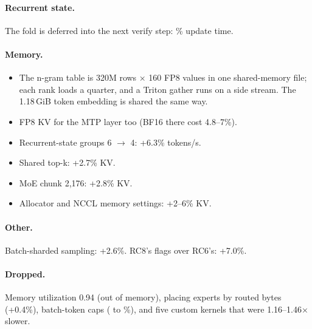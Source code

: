 \documentclass[10pt]{article}
\newcommand{\appminus}{\textminus}
\newcommand{\appminus}{\symbol{"2212}}
\newcommand{\mn}{\appminus}                     %
\begin{document}
\paragraph{Recurrent state.} The fold is deferred into the next verify step: \mn34\% update time.

\paragraph{Memory.}
\begin{itemize}
  \item The n-gram table is 320M rows × 160 FP8 values in one shared-memory file; each rank loads a quarter, and a
        Triton gather runs on a side stream. The 1.18\,GiB token embedding is shared the same way.
  \item FP8 KV for the MTP layer too (BF16 there cost 4.8--7\%).
  \item Recurrent-state groups 6 $\rightarrow$ 4: +6.3\% tokens/s.
  \item Shared top-k: +2.7\% KV.
  \item MoE chunk 2,176: +2.8\% KV.
  \item Allocator and NCCL memory settings: +2--6\% KV.
\end{itemize}

\paragraph{Other.} Batch-sharded sampling: +2.6\%. RC8's flags over RC6's: +7.0\%.

\paragraph{Dropped.} Memory utilization 0.94 (out of memory), placing experts by routed bytes (+0.4\%), batch-token caps
(\mn1.9 to \mn15\%), and five custom kernels that were 1.16--1.46× slower.
\end{document}
